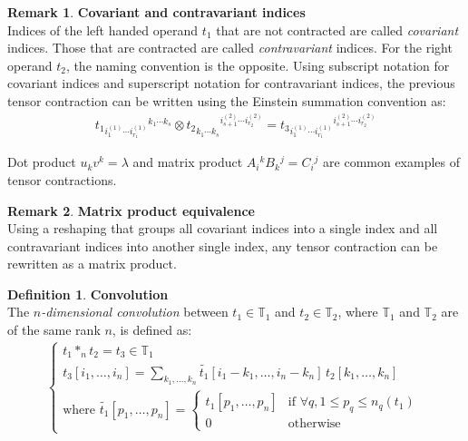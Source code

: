 \documentclass{article}
\theoremstyle{definition}
\newtheorem{definition}{Definition}[section]
\newtheorem{remark}{Remark}
\newcommand{\tspace}{\mathbb{T}}
\begin{document}
\begin{remark}\textbf{Covariant and contravariant indices}\\
Indices of the left handed operand $t_1$ that are not contracted are called \emph{covariant} indices. Those that are contracted are called \emph{contravariant} indices. For the right operand $t_2$, the naming convention is the opposite. Using subscript notation for covariant indices and superscript notation for contravariant indices, the previous tensor contraction can be written using the Einstein summation convention as:
\begin{gather*}
t_1 \hspace{0pt}_{i_1^{(1)} \cdots i_{r_1}^{(1)} } \hspace{0pt}^{ k_1 \cdots k_s} \otimes
t_2 \hspace{0pt}_{ k_1^{\phantom{(}} \cdots k_s^{\phantom{(}}} \hspace{0pt}^{i_{s+1}^{(2)} \cdots i_{r_2}^{(2)}} =
t_3 \hspace{0pt}_ {i_1^{(1)} \cdots i_{r_1}^{(1)} } \hspace{0pt}^{i_{s+1}^{(2)} \cdots i_{r_2}^{(2)}}
\end{gather*}
\end{remark}

Dot product $u_k v^k = \lambda $ and matrix product $A_i\hspace{0pt}^k B_k\hspace{0pt}^j = C_i\hspace{0pt}^j$ are common examples of tensor contractions.

\begin{remark}\textbf{Matrix product equivalence}\\
Using a reshaping that groups all covariant indices into a single index and all contravariant indices into another single index, any tensor contraction can be rewritten as a matrix product.
\end{remark}

\begin{definition}\textbf{Convolution}\\
The \emph{$n$-dimensional convolution} between $t_1 \in \tspace_1$ and $t_2 \in \tspace_2$, where $\tspace_1$ and $\tspace_2$ are of the same rank $n$, is defined as:
\begin{gather*}
\left\{
  \begin{array}{l}
t_1 \ast_n t_2 = t_3 \in \tspace_1 \\
t_3[i_1, \ldots, i_n] = \displaystyle \sum_{k_1, \ldots, k_n} \widetilde{t_1}[i_1 - k_1, \ldots, i_n - k_n] \hspace{2pt} t_2[k_1, \ldots, k_n] \\
\text{where } \widetilde{t_1}[p_1, \ldots, p_n] =
  \begin{cases}
  t_1[p_1, \ldots, p_n] & \text{if } \forall q, 1 \le p_q \le n_q(t_1) \\
  0 & \text{otherwise}
  \end{cases}
  \end{array}
\right.
\end{gather*}
\end{definition}
\end{document}
